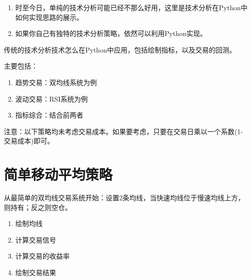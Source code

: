 \documentclass[
  letterpaper,
  DIV=11,
  numbers=noendperiod]{scrreprt}
\providecommand{\tightlist}{%
  \setlength{\itemsep}{0pt}\setlength{\parskip}{0pt}}\usepackage{longtable,booktabs,array}
\begin{document}
\begin{tcolorbox}[enhanced jigsaw, opacityback=0, left=2mm, coltitle=black, leftrule=.75mm, bottomtitle=1mm, arc=.35mm, opacitybacktitle=0.6, bottomrule=.15mm, breakable, colbacktitle=quarto-callout-warning-color!10!white, toprule=.15mm, toptitle=1mm, colframe=quarto-callout-warning-color-frame, titlerule=0mm, title=\textcolor{quarto-callout-warning-color}{\faExclamationTriangle}\hspace{0.5em}{Warning}, rightrule=.15mm, colback=white]

\begin{enumerate}
\def\labelenumi{\arabic{enumi}.}
\tightlist
\item
  时至今日，单纯的技术分析可能已经不那么好用，这里是技术分析在Python中如何实现思路的展示。
\item
  如果你自己有独特的技术分析策略，依然可以利用Python实现。
\end{enumerate}

\end{tcolorbox}

传统的技术分析技术怎么在Python中应用，包括绘制指标，以及交易的回测。

主要包括：

\begin{enumerate}
\def\labelenumi{\arabic{enumi}.}
\tightlist
\item
  趋势交易：双均线系统为例
\item
  波动交易：RSI系统为例
\item
  指标综合：结合前两者
\end{enumerate}

注意：以下策略均未考虑交易成本。如果要考虑，只要在交易日乘以一个系数(1-交易成本)即可。

\hypertarget{ux7b80ux5355ux79fbux52a8ux5e73ux5747ux7b56ux7565}{%
\section{简单移动平均策略}\label{ux7b80ux5355ux79fbux52a8ux5e73ux5747ux7b56ux7565}}

从最简单的双均线交易系统开始：设置2条均线，当快速均线位于慢速均线上方，则持有；反之则空仓。

\begin{enumerate}
\def\labelenumi{\arabic{enumi}.}
\tightlist
\item
  绘制均线
\item
  计算交易信号
\item
  计算交易的收益率
\item
  绘制交易结果
\end{enumerate}
\end{document}
